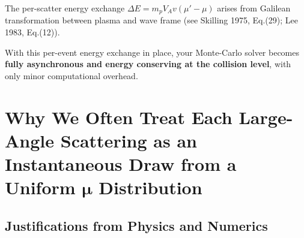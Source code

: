 {The per-scatter energy exchange $\Delta E = m_p V_A v (\mu' - \mu)$ arises from Galilean transformation between plasma and wave frame (see Skilling 1975, Eq.(29); Lee 1983, Eq.(12)).

\medskip

\noindent
With this per-event energy exchange in place, your Monte-Carlo solver becomes \textbf{fully asynchronous and energy conserving at the collision level}, with only minor computational overhead.


\section*{Why We Often Treat Each Large-Angle Scattering as an Instantaneous Draw from a Uniform $\bm{\mu}$ Distribution}

\subsection*{Justifications from Physics and Numerics}

}
